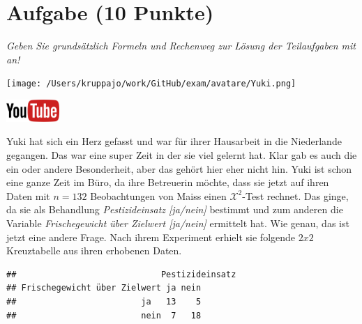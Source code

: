 \documentclass[a4paper, 9pt]{scrartcl}\usepackage[]{graphicx}\usepackage[]{xcolor}
\makeatletter
\newenvironment{kframe}{%
 \def\at@end@of@kframe{}%
 \ifinner\ifhmode%
  \def\at@end@of@kframe{\end{minipage}}%
  \begin{minipage}{\columnwidth}%
 \fi\fi%
 \def\FrameCommand##1{\hskip\@totalleftmargin \hskip-\fboxsep
 \colorbox{shadecolor}{##1}\hskip-\fboxsep
     \hskip-\linewidth \hskip-\@totalleftmargin \hskip\columnwidth}%
 \MakeFramed {\advance\hsize-\width
   \@totalleftmargin\z@ \linewidth\hsize
   \@setminipage}}%
 {\par\unskip\endMakeFramed%
 \at@end@of@kframe}
\newenvironment{knitrout}{}{} %
\makeatother
\begin{document}
\section{Aufgabe \hfill (10 Punkte)}

\textit{Geben Sie grundsätzlich Formeln und Rechenweg zur Lösung der Teilaufgaben mit an!} \\[1Ex]
 

 
\begin{minipage}[t]{0.5\textwidth}
\texttt{[image: /Users/kruppajo/work/GitHub/exam/avatare/Yuki.png]}
\end{minipage}
\begin{minipage}[t]{0.5\textwidth}
\hfill
\href{https://youtu.be/ghArbetOr_E}{\includegraphics[width = 2cm]{img/youtube}}\\[1Ex]
\end{minipage}
\vspace{1ex}



Yuki hat sich ein Herz gefasst und war für ihrer Hausarbeit in die Niederlande gegangen. Das war eine super Zeit in der sie viel gelernt hat. Klar gab es auch die ein oder andere Besonderheit, aber das gehört hier eher nicht hin. Yuki ist schon eine ganze Zeit im Büro, da ihre Betreuerin möchte, dass sie jetzt auf ihren Daten mit $n = 132$ Beobachtungen von Maiss einen $\mathcal{X}^2$-Test rechnet. Das ginge, da sie als Behandlung \textit{Pestizideinsatz [ja/nein]} bestimmt und zum anderen die Variable \textit{Frischegewicht über Zielwert [ja/nein]} ermittelt hat. Wie genau, das ist jetzt eine andere Frage. Nach ihrem Experiment erhielt sie folgende $2x2$ Kreuztabelle aus ihren erhobenen Daten.

\begin{knitrout}
\color{fgcolor}\begin{kframe}
\begin{verbatim}
##                             Pestizideinsatz
## Frischegewicht über Zielwert ja nein
##                         ja   13    5
##                         nein  7   18
\end{verbatim}
\end{kframe}
\end{knitrout}
\end{document}
